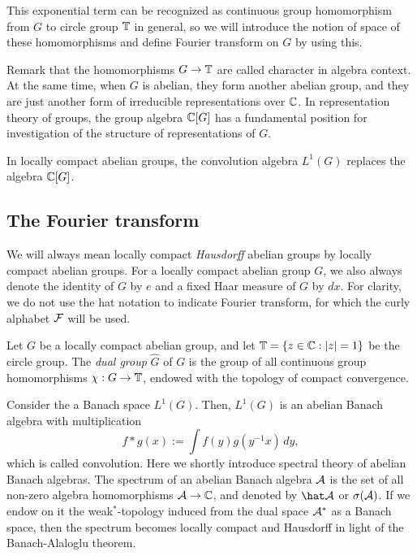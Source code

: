 \documentclass[a4paper]{article}
\begin{document}

This exponential term can be recognized as continuous group homomorphism from $G$ to circle group $\mathbb{T}$ in general, so we will introduce the notion of space of these homomorphisms and define Fourier transform on $G$ by using this.

Remark that the homomorphisms $G\to\mathbb{T}$ are called character in algebra context.
At the same time, when $G$ is abelian, they form another abelian group, and they are just another form of irreducible representations over $\mathbb{C}$.
In representation theory of groups, the group algebra $\mathbb{C}[G]$ has a fundamental position for investigation of the structure of representations of $G$.

In locally compact abelian groups, the convolution algebra $L^1(G)$ replaces the algebra $\mathbb{C}[G]$.





\subsection{The Fourier transform}

We will always mean locally compact \emph{Hausdorff} abelian groups by locally compact abelian groups.
For a locally compact abelian group $G$, we also always denote the identity of $G$ by $e$ and a fixed Haar measure of $G$ by $dx$.
For clarity, we do not use the hat notation to indicate Fourier transform, for which the curly alphabet $\mathcal{F}$ will be used.


\begin{defn}
Let $G$ be a locally compact abelian group, and let $\mathbb{T}=\{z\in\mathbb{C}:|z|=1\}$ be the circle group.
The \emph{dual group} $\hat G$ of $G$ is the group of all continuous group homomorphisms $\chi:G\to\mathbb{T}$, endowed with the topology of compact convergence.
\end{defn}


Consider the a Banach space $L^1(G)$.
Then, $L^1(G)$ is an abelian Banach algebra with multiplication
\[f*g(x):=\int f(y)g(y^{-1}x)\,dy,\]
which is called convolution.
Here we shortly introduce spectral theory of abelian Banach algebras.
The spectrum of an abelian Banach algebra $\mathcal{A}$ is the set of all non-zero algebra homomorphisms $\mathcal{A}\to\mathbb{C}$, and denoted by $\hat\cA$ or $\sigma(\mathcal{A})$.
If we endow on it the weak$^*$-topology induced from the dual space $\mathcal{A}^*$ as a Banach space, then the spectrum becomes locally compact and Hausdorff in light of the Banach-Alaloglu theorem.
\end{document}
